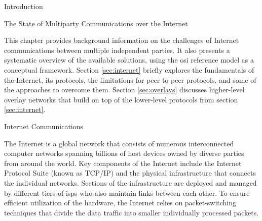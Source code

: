 \begin{frame}
\tableofcontents

\todototoc

\listoftodos

\printnoidxglossary[type=\acronymtype,title=Glossary]

\listoffigures

\mainmatter

\begin{block}{Introduction}
\protect\hypertarget{introduction}{}
\end{block}
\end{frame}

\begin{frame}[fragile]{The State of Multiparty Communications over the
Internet}
\protect\hypertarget{the-state-of-multiparty-communications-over-the-internet}{}

This chapter provides background information on the challenges of
Internet communications between multiple independent parties. It also
presents a systematic overview of the available solutions, using the
\gls{osi} reference model as a conceptual framework. Section
\ref{sec:internet} briefly explores the fundamentals of the Internet,
its protocols, the limitations for peer-to-peer protocols, and some of
the approaches to overcome them. Section \ref{sec:overlays} discusses
higher-level overlay networks that build on top of the lower-level
protocols from section \ref{sec:internet}.

\begin{block}{Internet Communications}
\protect\hypertarget{sec:internet}{}

The Internet is a global network that consists of numerous
interconnected computer networks spanning billions of host devices owned
by diverse parties from around the world. Key components of the Internet
include the Internet Protocol Suite (known as TCP/IP) and the physical
infrastructure that connects the individual networks. Sections of the
infrastructure are deployed and managed by different tiers of
\glspl{isp} who also maintain links between each other. To ensure
efficient utilization of the hardware, the Internet relies on
packet-switching techniques that divide the data traffic into smaller
individually processed packets.


\end{block}
\end{frame}
